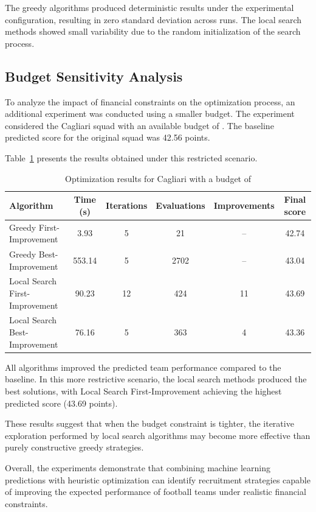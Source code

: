 \documentclass[12pt]{article}
\begin{document}
The greedy algorithms produced deterministic results under the experimental configuration, resulting in zero standard deviation across
runs. The local search methods showed small variability due to the random initialization of the search process.

\subsection{Budget Sensitivity Analysis}

To analyze the impact of financial constraints on the optimization process, an additional experiment was conducted using a smaller budget.
The experiment considered the Cagliari squad with an available budget of . The baseline predicted score for the original squad was 42.56 points.

Table~\ref{tab:cagliari_budget} presents the results obtained under
this restricted scenario.

\begin{table}[htbp]
\centering
\caption{Optimization results for Cagliari with a budget of }
\label{tab:cagliari_budget}
\begin{tabular}{lccccc}
\toprule
Algorithm & Time (s) & Iterations & Evaluations & Improvements & Final score \\
\midrule
Greedy First-Improvement & 3.93 & 5 & 21 & -- & 42.74 \\
Greedy Best-Improvement & 553.14 & 5 & 2702 & -- & 43.04 \\
Local Search First-Improvement & 90.23 & 12 & 424 & 11 & 43.69 \\
Local Search Best-Improvement & 76.16 & 5 & 363 & 4 & 43.36 \\
\bottomrule
\end{tabular}
\end{table}

All algorithms improved the predicted team performance compared to the baseline. In this more restrictive scenario, the local search methods
produced the best solutions, with Local Search First-Improvement achieving the highest predicted score (43.69 points).

These results suggest that when the budget constraint is tighter, the iterative exploration performed by local search algorithms may become
more effective than purely constructive greedy strategies.

Overall, the experiments demonstrate that combining machine learning predictions with heuristic optimization can identify recruitment strategies capable 
of improving the expected performance of football teams under realistic financial constraints.
\end{document}
